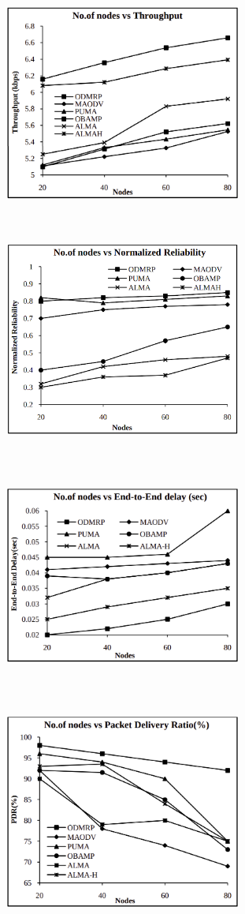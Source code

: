 \begin{figure}[!htbp]%
    \centering
    \includegraphics[width=7.8cm, height=7.8cm]{images/nodes-vs-throughput.png}
    \includegraphics[width=7.8cm, height=7.8cm]{images/nodes-vs-reliability.png}
    \includegraphics[width=7.8cm, height=7.8cm]{images/nodes-vs-e2edelay.png}
    \includegraphics[width=7.8cm, height=7.8cm]{images/nodes-vs-pdr.png}

\end{figure}
